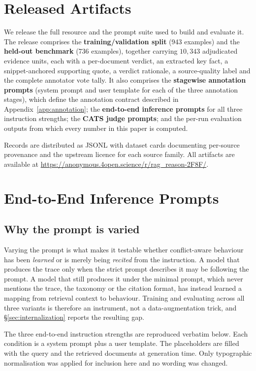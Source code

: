 \section{Released Artifacts}
\label{app:annprompts}

We release the full resource and the prompt suite used to build and evaluate it.
The release comprises the \textbf{training/validation split} (943 examples) and
the \textbf{held-out benchmark} (736 examples), together carrying $10{,}343$
adjudicated evidence units, each with a per-document verdict, an extracted key
fact, a snippet-anchored supporting quote, a verdict rationale, a source-quality
label and the complete annotator vote tally. It also comprises the \textbf{stagewise annotation
prompts} (system prompt and user template for each of the three annotation
stages), which define the annotation contract described in
Appendix~\ref{app:annotation}; the \textbf{end-to-end inference prompts} for all
three instruction strengths; the \textbf{CATS judge prompts}; and the per-run
evaluation outputs from which every number in this paper is computed.

Records are distributed as JSONL with dataset cards documenting per-source
provenance and the upstream licence for each source family. All artifacts are
available at \url{https://anonymous.4open.science/r/rag_reason-2F8F/}.

\section{End-to-End Inference Prompts}
\label{app:e2eprompts}

\subsection{Why the prompt is varied}

Varying the prompt is what makes it testable whether conflict-aware behaviour has
been \emph{learned} or is merely being \emph{recited} from the instruction. A
model that produces the trace only when the strict prompt describes it may be
following the prompt. A model that still produces it under the minimal prompt,
which never mentions the trace, the taxonomy or the citation format, has instead learned
a mapping from retrieval context to behaviour. Training and evaluating across all
three variants is therefore an instrument, not a data-augmentation trick, and
\S\ref{sec:internalization} reports the resulting gap.

The three end-to-end instruction strengths are reproduced verbatim below. Each
condition is a system prompt plus a user template. The placeholders are filled
with the query and the retrieved documents at generation time. Only typographic
normalisation was applied for inclusion here and no wording was changed.

